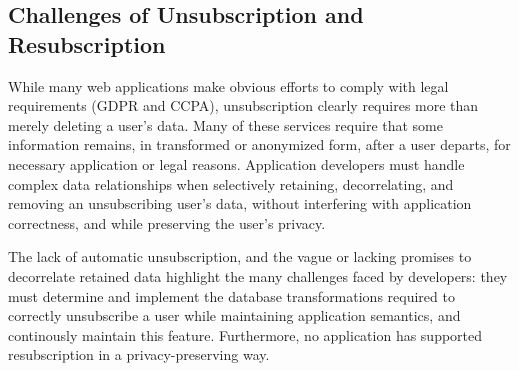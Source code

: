 %
%
%
%

\subsection{Challenges of Unsubscription and Resubscription}
While many web applications make obvious efforts to comply with legal requirements (GDPR and CCPA),
unsubscription clearly requires more than merely deleting a user's data. Many of these services
require that some information remains, in transformed or anonymized form, after a user departs, for
necessary application or legal reasons. Application developers must handle complex data
relationships when selectively retaining, decorrelating, and removing an unsubscribing user's data,
without interfering with application correctness, and while preserving the user's privacy.

The lack of automatic unsubscription, and the vague or lacking promises to decorrelate retained data
highlight the many challenges faced by developers: they must determine and implement the database
transformations required to correctly unsubscribe a user while maintaining application semantics,
and continously maintain this feature. Furthermore, no application has supported resubscription in a
privacy-preserving way.


